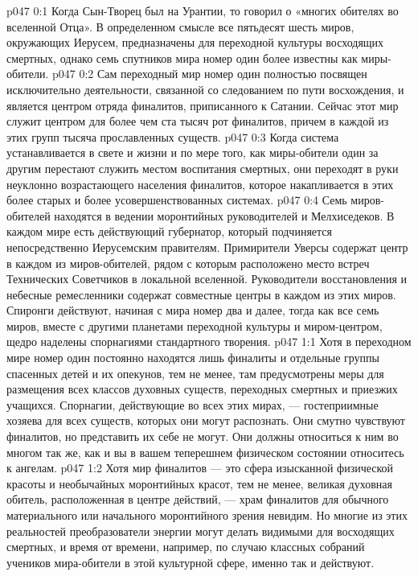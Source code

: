 \author{Блестящая Вечерняя Звезда}
\vs p047 0:1 Когда Сын\hyp{}Творец был на Урантии, то говорил о «многих обителях во вселенной Отца». В определенном смысле все пятьдесят шесть миров, окружающих Иерусем, предназначены для переходной культуры восходящих смертных, однако семь спутников мира номер один более известны как миры\hyp{}обители.
\vs p047 0:2 Сам переходный мир номер один полностью посвящен исключительно деятельности, связанной со следованием по пути восхождения, и является центром отряда финалитов, приписанного к Сатании. Сейчас этот мир служит центром для более чем ста тысяч рот финалитов, причем в каждой из этих групп тысяча прославленных существ.
\vs p047 0:3 Когда система устанавливается в свете и жизни и по мере того, как миры\hyp{}обители один за другим перестают служить местом воспитания смертных, они переходят в руки неуклонно возрастающего населения финалитов, которое накапливается в этих более старых и более усовершенствованных системах.
\vs p047 0:4 Семь миров\hyp{}обителей находятся в ведении моронтийных руководителей и Мелхиседеков. В каждом мире есть действующий губернатор, который подчиняется непосредственно Иерусемским правителям. Примирители Уверсы содержат центр в каждом из миров\hyp{}обителей, рядом с которым расположено место встреч Технических Советчиков в локальной вселенной. Руководители восстановления и небесные ремесленники содержат совместные центры в каждом из этих миров. Спиронги действуют, начиная с мира номер два и далее, тогда как все семь миров, вместе с другими планетами переходной культуры и миром\hyp{}центром, щедро наделены спорнагиями стандартного творения.
\vs p047 1:1 Хотя в переходном мире номер один постоянно находятся лишь финалиты и отдельные группы спасенных детей и их опекунов, тем не менее, там предусмотрены меры для размещения всех классов духовных существ, переходных смертных и приезжих учащихся. Спорнагии, действующие во всех этих мирах, --- гостеприимные хозяева для всех существ, которых они могут распознать. Они смутно чувствуют финалитов, но представить их себе не могут. Они должны относиться к ним во многом так же, как и вы в вашем теперешнем физическом состоянии относитесь к ангелам.
\vs p047 1:2 Хотя мир финалитов --- это сфера изысканной физической красоты и необычайных моронтийных красот, тем не менее, великая духовная обитель, расположенная в центре действий, --- храм финалитов для обычного материального или начального моронтийного зрения невидим. Но многие из этих реальностей преобразователи энергии могут делать видимыми для восходящих смертных, и время от времени, например, по случаю классных собраний учеников мира\hyp{}обители в этой культурной сфере, именно так и действуют.
